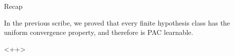 \documentclass{article}
\begin{document}
\makeheader%

\begin{ssection}{Recap}

	In the previous scribe, we proved that every finite hypothesis class has the uniform convergence property, and therefore is PAC learnable.

\end{ssection}<++>
\end{document}
